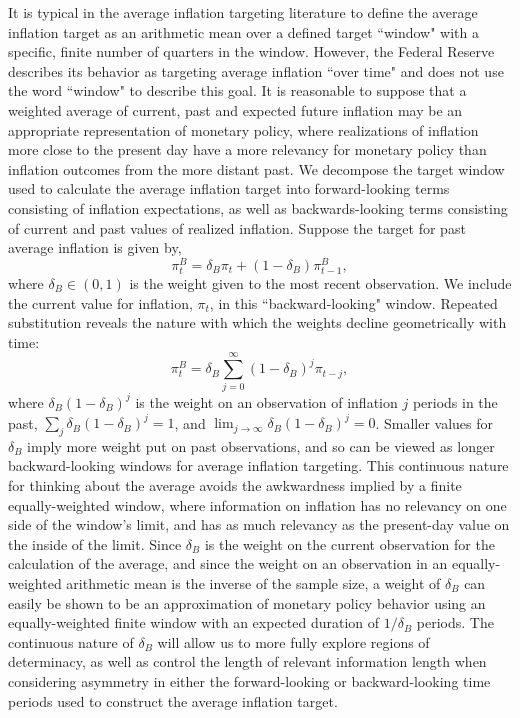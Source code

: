 \documentclass[english,authoryear,12pt]{elsarticle}
\begin{document}
It is typical in the average inflation targeting literature to define the average inflation target as an arithmetic mean over a defined target ``window" with a specific, finite number of quarters in the window. However, the Federal Reserve describes its behavior as targeting average inflation ``over time" and does not use the word ``window" to describe this goal. It is reasonable to suppose that a weighted average of current, past and expected future inflation may be an appropriate representation of monetary policy, where realizations of inflation more close to the present day have a more relevancy for monetary policy than inflation outcomes from the more distant past. We decompose the target window used to calculate the average inflation target into forward-looking terms consisting of inflation expectations, as well as backwards-looking terms consisting of current and past values of realized inflation. Suppose the target for past average inflation is given by,
\begin{equation}\label{eq:backward}
	\pi_t^B = \delta_B \pi_t + (1-\delta_B) \pi_{t-1}^B,
\end{equation}
where $\delta_B \in (0,1)$ is the weight given to the most recent observation. We include the current value for inflation, $\pi_t$, in this ``backward-looking" window.  Repeated substitution reveals the nature with which the weights decline geometrically with time:
\begin{equation}\label{eq:backward_all}
	\pi_t^B = \delta_B \sum_{j=0}^{\infty} (1-\delta_B)^j \pi_{t-j},
\end{equation}
where $\delta_B (1-\delta_B)^j$ is the weight on an observation of inflation $j$ periods in the past, $\sum_j \delta_B (1-\delta_B)^j=1$, and $\lim_{j \to \infty} \delta_B (1-\delta_B)^j=0$. Smaller values for $\delta_B$ imply more weight put on past observations, and so can be viewed as longer backward-looking windows for average inflation targeting. This continuous nature for thinking about the average avoids the awkwardness implied by a finite equally-weighted window, where information on inflation has no relevancy on one side of the window's limit, and has as much relevancy as the present-day value on the inside of the limit. Since $\delta_B$ is the weight on the current observation for the calculation of the average, and since the weight on an observation in an equally-weighted arithmetic mean is the inverse of the sample size, a weight of $\delta_B$ can easily be shown to be an approximation of monetary policy behavior using an equally-weighted finite window with an expected duration of $1 / \delta_B$ periods. The continuous nature of $\delta_B$ will allow us to more fully explore regions of determinacy, as well as control the length of relevant information length when considering asymmetry in either the forward-looking or backward-looking time periods used to construct the average inflation target.
\end{document}
